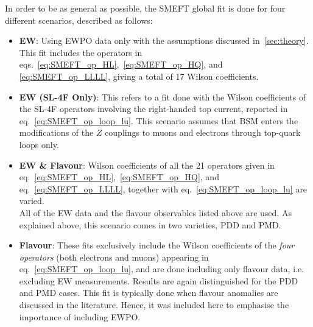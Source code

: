 \par In order to be as general as possible, the SMEFT global fit is done for four different scenarios, described as follows:
\begin{itemize}
	\setlength\itemsep{0em}
	\item {\bf EW}: 
	Using EWPO data only with the assumptions discussed in~\autoref{sec:theory}. This fit includes the operators in eqs.~\eqref{eq:SMEFT_op_HL},~\eqref{eq:SMEFT_op_HQ}, and \eqref{eq:SMEFT_op_LLLL},  giving a total of 17 Wilson coefficients.
	\item  {\bf EW (SL-4F Only)}: This refers to a fit done with the Wilson coefficients of the { SL-4F operators} involving the right-handed top current, reported in eq.~\eqref{eq:SMEFT_op_loop_lu}. This scenario assumes that BSM enters the modifications of the $Z$ couplings to muons and electrons through top-quark loops only.
	\item {\bf EW \& Flavour}: Wilson coefficients of all the { 21 operators} given in eq.~\eqref{eq:SMEFT_op_HL},~\eqref{eq:SMEFT_op_HQ}, and eq.~\eqref{eq:SMEFT_op_LLLL}, together with eq.~\eqref{eq:SMEFT_op_loop_lu} are varied.\\
	All of the EW data and the flavour observables listed above are used. As explained above, this scenario comes in two varieties, PDD and PMD.
	\item {\bf Flavour}: These fits exclusively include the Wilson coefficients of the {\em four operators} (both electrons and muons) appearing in eq.~\eqref{eq:SMEFT_op_loop_lu}, and are done including only flavour data, i.e. excluding EW measurements. Results are again distinguished for the PDD and PMD cases. This fit is typically done when flavour anomalies are discussed in the literature. Hence, it was included here to emphasise the importance of including EWPO.
\end{itemize}
